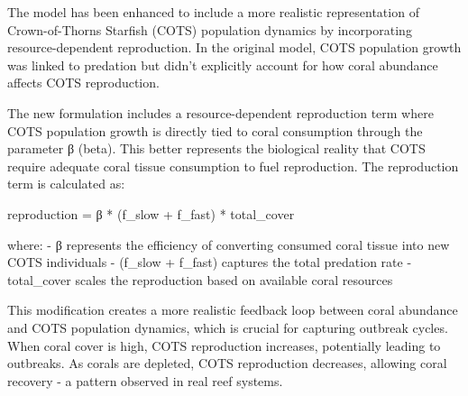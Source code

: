 The model has been enhanced to include a more realistic representation of Crown-of-Thorns Starfish (COTS) population dynamics by incorporating resource-dependent reproduction. In the original model, COTS population growth was linked to predation but didn't explicitly account for how coral abundance affects COTS reproduction.

The new formulation includes a resource-dependent reproduction term where COTS population growth is directly tied to coral consumption through the parameter β (beta). This better represents the biological reality that COTS require adequate coral tissue consumption to fuel reproduction. The reproduction term is calculated as:

reproduction = β * (f_slow + f_fast) * total_cover

where:
- β represents the efficiency of converting consumed coral tissue into new COTS individuals
- (f_slow + f_fast) captures the total predation rate
- total_cover scales the reproduction based on available coral resources

This modification creates a more realistic feedback loop between coral abundance and COTS population dynamics, which is crucial for capturing outbreak cycles. When coral cover is high, COTS reproduction increases, potentially leading to outbreaks. As corals are depleted, COTS reproduction decreases, allowing coral recovery - a pattern observed in real reef systems.
